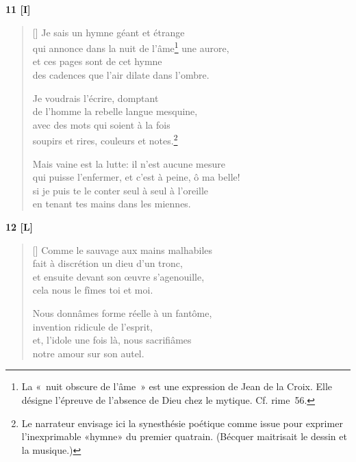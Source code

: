 \documentclass[a4paper,12pt]{book}
\begin{document}
\bigskip

\begin{center}
  \textbf{11 [I]}
\end{center}

\settowidth{\versewidth}{qui puisse l'enfermer, et c'est à peine, ô ma belle!}

\begin{verse}[\versewidth]
  Je sais un hymne géant et étrange \\
  qui annonce dans la nuit de l'âme\footnote{La «~nuit obscure de
  l'âme~» est une expression de Jean de la Croix. Elle
  désigne l'épreuve de l'absence de Dieu chez le
  mytique. Cf. rime~56.} une aurore, \\
  et ces pages sont de cet hymne \\
  des cadences que l'air dilate dans l'ombre.

  Je voudrais l'écrire, domptant \\
  de l'homme la rebelle langue mesquine, \\
  avec des mots qui soient à la fois \\
  soupirs et rires, couleurs et notes.\footnote{Le narrateur envisage
  ici la synesthésie poétique comme issue pour exprimer
  l'inexprimable «hymne» du premier quatrain. (Bécquer maitrisait le
  dessin et la musique.)}

  Mais vaine est la lutte: il n'est aucune mesure \\
  qui puisse l'enfermer, et c'est à peine, ô ma belle! \\
  si je puis te le conter seul à seul à l'oreille \\
  en tenant tes mains dans les miennes.
\end{verse}

\bigskip

\begin{center}
  \textbf{12 [L]}
\end{center}

\settowidth{\versewidth}{et, l'idole une fois là, nous sacrifiâmes}

\begin{verse}[\versewidth]
  Comme le sauvage aux mains malhabiles \\
  fait à discrétion un dieu d'un tronc, \\
  et ensuite devant son œuvre s'agenouille, \\
  cela nous le fîmes toi et moi.

  Nous donnâmes forme réelle à un fantôme, \\
  invention ridicule de l'esprit, \\
  et, l'idole une fois là, nous sacrifiâmes \\
  notre amour sur son autel.
\end{verse}
\end{document}
